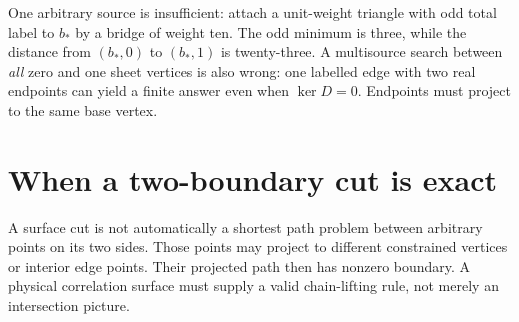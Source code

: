 One arbitrary source is insufficient: attach a unit-weight triangle with
odd total label to $b_*$ by a bridge of weight ten. The odd minimum is
three, while the distance from $(b_*,0)$ to $(b_*,1)$ is twenty-three.
A multisource search between \emph{all} zero and one sheet vertices is
also wrong: one labelled edge with two real endpoints can yield a finite
answer even when $\ker D=0$. Endpoints must project to the same base vertex.

\section{When a two-boundary cut is exact}
\label{sec:cl-cut}
A surface cut is not automatically a shortest path problem between arbitrary
points on its two sides. Those points may project to different constrained
vertices or interior edge points. Their projected path then has nonzero
boundary. A physical correlation surface must supply a valid chain-lifting
rule, not merely an intersection picture.

